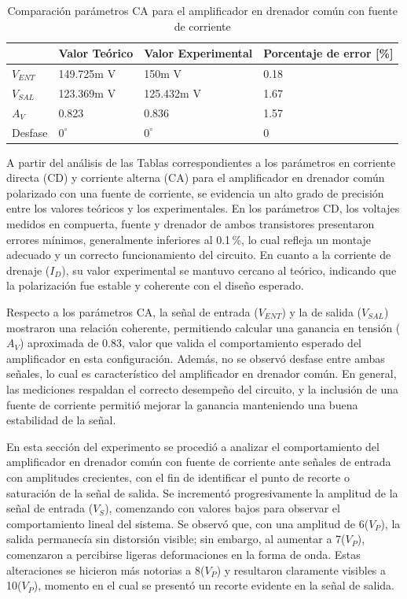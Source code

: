 \documentclass[journal]{IEEEtran}
\begin{document}
\begin{table}[h]
    \caption{Comparación parámetros CA para el amplificador en drenador común con fuente de corriente}
    \centering
    \renewcommand{\arraystretch}{1.2} %
    \begin{tabular}{|l|p{2cm}|p{2cm}|p{2cm}|}
        \hline
        & \textbf{Valor Teórico} & \textbf{Valor Experimental} & \textbf{Porcentaje de error [\%]} \\
        \hline
        \( V_{ENT} \) & 149.725m V  & 150m V  & 0.18 \\
        \hline
        \( V_{SAL} \) & 123.369m V   & 125.432m V  & 1.67 \\
        \hline
        \( A_V \) & 0.823 & 0.836 & 1.57 \\
        \hline
        Desfase & $0^\circ$  & $0^\circ$  & 0 \\
        \hline
    \end{tabular}
    \label{tab:resistencias}
\end{table}
\par A partir del análisis de las Tablas correspondientes a los parámetros en corriente directa (CD) y corriente alterna (CA) para el amplificador en drenador común polarizado con una fuente de corriente, se evidencia un alto grado de precisión entre los valores teóricos y los experimentales. En los parámetros CD, los voltajes medidos en compuerta, fuente y drenador de ambos transistores presentaron errores mínimos, generalmente inferiores al 0.1\,\%, lo cual refleja un montaje adecuado y un correcto funcionamiento del circuito. En cuanto a la corriente de drenaje (\( I_D \)), su valor experimental se mantuvo cercano al teórico, indicando que la polarización fue estable y coherente con el diseño esperado.
\par Respecto a los parámetros CA, la señal de entrada (\( V_{ENT} \)) y la de salida (\( V_{SAL} \)) mostraron una relación coherente, permitiendo calcular una ganancia en tensión (\( A_V \)) aproximada de 0.83, valor que valida el comportamiento esperado del amplificador en esta configuración. Además, no se observó desfase entre ambas señales, lo cual es característico del amplificador en drenador común. En general, las mediciones respaldan el correcto desempeño del circuito, y la inclusión de una fuente de corriente permitió mejorar la ganancia manteniendo una buena estabilidad de la señal.
\par En esta sección del experimento se procedió a analizar el comportamiento del amplificador en drenador común con fuente de corriente ante señales de entrada con amplitudes crecientes, con el fin de identificar el punto de recorte o saturación de la señal de salida. Se incrementó progresivamente la amplitud de la señal de entrada (\( V_S \)), comenzando con valores bajos para observar el comportamiento lineal del sistema. Se observó que, con una amplitud de 6(\( V_P \)), la salida permanecía sin distorsión visible; sin embargo, al aumentar a 7(\( V_P \)), comenzaron a percibirse ligeras deformaciones en la forma de onda. Estas alteraciones se hicieron más notorias a 8(\( V_P \)) y resultaron claramente visibles a 10(\( V_P \)), momento en el cual se presentó un recorte evidente en la señal de salida.
\end{document}
